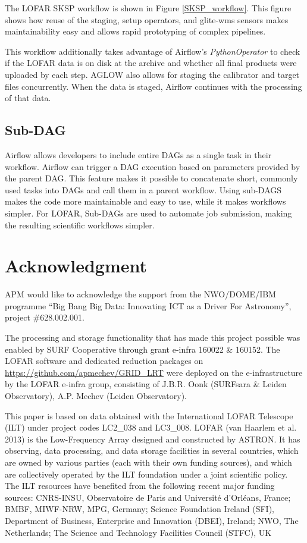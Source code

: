 \begin{subappendices}
The LOFAR SKSP workflow is shown in Figure \ref{SKSP_workflow}. This figure shows how reuse of the staging, setup operators, and glite-wms sensors makes maintainability easy and allows rapid prototyping of complex pipelines. 
 
 This workflow additionally takes advantage of Airflow's \textit{PythonOperator} to check if the LOFAR data is on disk at the archive and whether all final products were uploaded by each step. AGLOW also allows for staging the calibrator and target files concurrently. When the data is staged, Airflow continues with the processing of that data. 

\subsection{Sub-DAG}\label{sec:Subdags}
Airflow allows developers to include entire DAGs as a single task in their workflow. Airflow can trigger a DAG execution based on parameters provided by the parent DAG. This feature makes it possible to concatenate short, commonly used tasks into DAGs and call them in a parent workflow. Using sub-DAGS makes the code more maintainable and easy to use, while it makes workflows simpler. For LOFAR, Sub-DAGs are used to automate job submission, making the resulting scientific workflows simpler. 

   
\end{subappendices}
\section*{Acknowledgment}

APM would like to acknowledge the support from the NWO/DOME/IBM programme ``Big Bang Big Data: Innovating ICT as a Driver For Astronomy'', project \#628.002.001.

The processing and storage functionality that has made this project possible was enabled by SURF Cooperative through grant e-infra 160022 \& 160152. The LOFAR software and dedicated reduction packages
on \url{https://github.com/apmechev/GRID_LRT} were deployed on the e-infrastructure by the LOFAR e-infra group, consisting of J.B.R. Oonk (SURFsara \& Leiden Observatory), A.P. Mechev (Leiden Observatory).

This paper is based on data obtained with the International LOFAR Telescope (ILT) under project codes LC2\_038 and LC3\_008. LOFAR (van Haarlem et al. 2013) is the Low-Frequency Array designed and constructed by ASTRON. It has observing, data processing, and data storage facilities in several countries, which are owned by various parties (each with their own funding sources), and which are collectively operated by the ILT foundation under a joint scientific policy. The ILT resources have benefited from the following recent major funding sources: CNRS-INSU, Observatoire de Paris and Universit\'{e} d’Orl\'{e}ans, France; BMBF, MIWF-NRW, MPG, Germany; Science Foundation Ireland (SFI), Department of Business, Enterprise and Innovation (DBEI), Ireland; NWO, The Netherlands; The Science and Technology Facilities Council (STFC), UK




